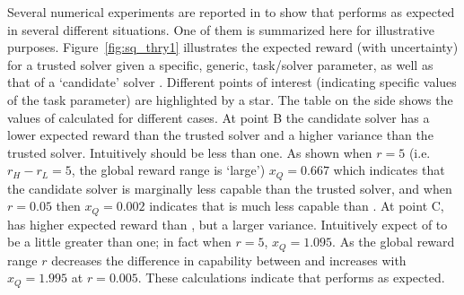 Several numerical experiments are reported in \cite{Israelsen2018-qz} to show that \xQ{} performs as expected in several different situations. One of them is summarized here for illustrative purposes. Figure~\ref{fig:sq_thry1} illustrates the expected reward (with uncertainty) for a trusted solver \solvestar{} given a specific, generic, task/solver parameter, as well as that of a `candidate' solver \solve. Different points of interest (indicating specific values of the task parameter) are highlighted by a star. The table on the side shows the values of \xQ{} calculated for different cases. At point B the candidate solver has a lower expected reward than the trusted solver and a higher variance than the trusted solver. Intuitively \xQ{} should be less than one. As shown when $r=5$ (i.e. $r_H-r_L=5$, the global reward range is `large') $x_Q=0.667$ which indicates that the candidate solver is marginally less capable than the trusted solver, and when $r=0.05$ then $x_Q=0.002$ indicates that \solve{} is much less capable than \solvestar. At point C, \solve{} has higher expected reward than \solvestar, but a larger variance. Intuitively expect \xQ{} of \solve{} to be a little greater than one; in fact when $r=5$, $x_Q=1.095$. As the global reward range $r$ decreases the difference in capability between \solve{} and \solvestar{} increases with $x_Q=1.995$ at $r=0.005$. These calculations indicate that \xQ{} performs as expected.

